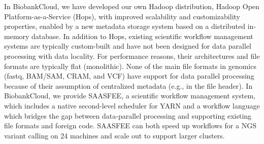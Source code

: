 In BiobankCloud, we have developed our own Hadoop distribution, Hadoop Open Platform-as-a-Service (Hops), with improved scalability and customizability properties, enabled by a new metadata storage system based on a distributed in-memory database. In addition to Hops, existing scientific workflow management systems are typically custom-built and have not been designed for data parallel processing with data locality. For performance reasons, their architectures and file formats are typically flat (monolithic). None of the main file formats in genomics (fastq, BAM/SAM, CRAM, and VCF) have support for data parallel processing because of their assumption of centralized metadata (e.g., in the file header). In BiobankCloud, we provide SAASFEE, a scientific workflow management system, which includes a native second-level scheduler for YARN and a workflow language which bridges the gap between data-parallel processing and supporting existing file formats and foreign code. SAASFEE can both speed up workflows for a NGS variant calling on 24 machines and scale out to support larger clusters.